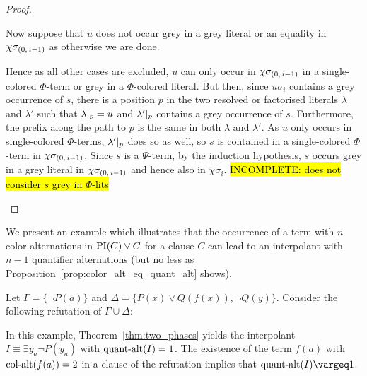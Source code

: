 \documentclass[,%
	draft=false,%
	numbers=noendperiod
	12pt,
	a4paper,
	oneside,%
	openany,
]{memoir}
\newcommand{\inv}{\ensuremath{\chi}}
\begin{document}
\begin{proof}
\begin{itemize}
		Now suppose that $u$ does not occur grey in a grey literal or an equality in $\inv\sigmazmi$ as otherwise we are done.

		Hence as all other cases are excluded, $u$ can only occur in $\inv\sigmazmi$ in a single-colored $\Phi$-term or grey in a $\Phi$-colored literal.
		But then, 
		since $u\sigma_i$ contains a grey occurrence of $s$, there is a position $p$ in the two resolved or factorised literals $\lambda$ and $\lambda'$ such that $\lambda\at{p} = u$ and $\lambda'\at{p}$ contains a grey occurrence of $s$.
		Furthermore, the prefix along the path to $p$ is the same in both $\lambda$ and $\lambda'$.
		As $u$ only occurs in single-colored $\Phi$-terms, $\lambda'\at{p}$ does so as well, so $s$ is contained in a single-colored $\Phi$-term in $\inv\sigmazmi$.
		Since $s$ is a $\Psi$-term, by the induction hypothesis, $s$ occurs grey in a grey literal in $\inv\sigmazmi$ and hence also in $\inv\sigma_i$.
		\hl{ INCOMPLETE: does not consider $s$ grey in $\Phi$-lits}
		\qedhere
\end{itemize}

\end{proof}

We present an example which illustrates that the occurrence of a term with $n$ color alternations in $\PI(C) \lor C$ for a clause $C$ can lead to an interpolant with $n-1$ quantifier alternations (but no less as Proposition~\ref{prop:color_alt_eq_quant_alt} shows).
\begin{exa}
	Let $\Gamma = \{ \lnot P(a) \}$ and $\Delta = \{ P(x) \lor Q(f(x)), \lnot Q(y) \}$.
	Consider the following refutation of $\Gamma \cup \Delta$:
	\begin{prooftree}


	\end{prooftree}

	In this example, Theorem~\ref{thm:two_phases} yields the interpolant $I \equiv \exists y_a \lnot P(y_a)$ with $\qa(I) =\nolinebreak 1$.
	The existence of the term $f(a)$ with $\ca(f(a)) = 2$ in a clause of the refutation implies that $\qa(I) \vargeq 1$.
\end{exa}
\end{document}
